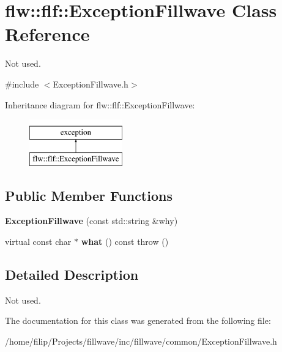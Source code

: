 \hypertarget{classflw_1_1flf_1_1ExceptionFillwave}{}\section{flw\+:\+:flf\+:\+:Exception\+Fillwave Class Reference}
\label{classflw_1_1flf_1_1ExceptionFillwave}


Not used.  




{\ttfamily \#include $<$Exception\+Fillwave.\+h$>$}

Inheritance diagram for flw\+:\+:flf\+:\+:Exception\+Fillwave\+:\begin{figure}[H]
\begin{center}
\leavevmode
\includegraphics[height=2.000000cm]{classflw_1_1flf_1_1ExceptionFillwave}
\end{center}
\end{figure}
\subsection*{Public Member Functions}
\begin{DoxyCompactItemize}
\item 
{\bfseries Exception\+Fillwave} (const std\+::string \&why)\hypertarget{classflw_1_1flf_1_1ExceptionFillwave_a342a4c65c3bf2b3cff8d0d161e637912}{}\label{classflw_1_1flf_1_1ExceptionFillwave_a342a4c65c3bf2b3cff8d0d161e637912}

\item 
virtual const char $\ast$ {\bfseries what} () const   throw ()\hypertarget{classflw_1_1flf_1_1ExceptionFillwave_a22a9ab0bb2faaa625af447f83fa50e2e}{}\label{classflw_1_1flf_1_1ExceptionFillwave_a22a9ab0bb2faaa625af447f83fa50e2e}

\end{DoxyCompactItemize}


\subsection{Detailed Description}
Not used. 

The documentation for this class was generated from the following file\+:\begin{DoxyCompactItemize}
\item 
/home/filip/\+Projects/fillwave/inc/fillwave/common/Exception\+Fillwave.\+h\end{DoxyCompactItemize}
